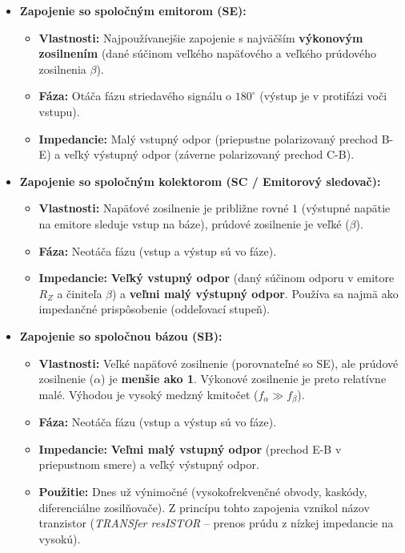 \begin{itemize}
	\item \textbf{Zapojenie so spoločným emitorom (SE):}
	\begin{itemize}
		\item \textbf{Vlastnosti:} Najpoužívanejšie zapojenie s najväčším \textbf{výkonovým zosilnením} (dané súčinom veľkého napäťového a veľkého prúdového zosilnenia $\beta$).
		\item \textbf{Fáza:} Otáča fázu striedavého signálu o $180^\circ$ (výstup je v protifázi voči vstupu).
		\item \textbf{Impedancie:} Malý vstupný odpor (priepustne polarizovaný prechod B-E) a veľký výstupný odpor (záverne polarizovaný prechod C-B).
	\end{itemize}
	
	\item \textbf{Zapojenie so spoločným kolektorom (SC / Emitorový sledovač):}
	\begin{itemize}
		\item \textbf{Vlastnosti:} Napäťové zosilnenie je približne rovné $1$ (výstupné napätie na emitore sleduje vstup na báze), prúdové zosilnenie je veľké ($\beta$).
		\item \textbf{Fáza:} Neotáča fázu (vstup a výstup sú vo fáze).
		\item \textbf{Impedancie:} \textbf{Veľký vstupný odpor} (daný súčinom odporu v emitore $R_Z$ a činiteľa $\beta$) a \textbf{veľmi malý výstupný odpor}. Používa sa najmä ako impedančné prispôsobenie (oddeľovací stupeň).
	\end{itemize}
	
	\item \textbf{Zapojenie so spoločnou bázou (SB):}
	\begin{itemize}
		\item \textbf{Vlastnosti:} Veľké napäťové zosilnenie (porovnateľné so SE), ale prúdové zosilnenie ($\alpha$) je \textbf{menšie ako 1}. Výkonové zosilnenie je preto relatívne malé. Výhodou je vysoký medzný kmitočet ($f_\alpha \gg f_\beta$).
		\item \textbf{Fáza:} Neotáča fázu (vstup a výstup sú vo fáze).
		\item \textbf{Impedancie:} \textbf{Veľmi malý vstupný odpor} (prechod E-B v priepustnom smere) a veľký výstupný odpor.
		\item \textbf{Použitie:} Dnes už výnimočné (vysokofrekvenčné obvody, kaskódy, diferenciálne zosilňovače). Z princípu tohto zapojenia vznikol názov tranzistor (\textit{TRANSfer resISTOR} – prenos prúdu z nízkej impedancie na vysokú).
	\end{itemize}
\end{itemize}
